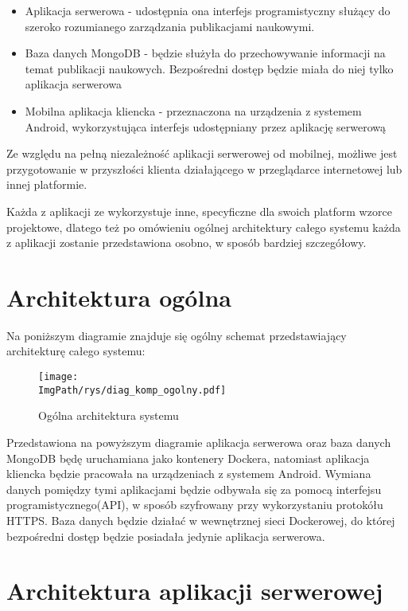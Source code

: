 \documentclass[a4paper,12pt,twoside,openany]{report}
\newcommand{\ImgPath}{.}
\begin{document}
\begin{itemize}
	\item Aplikacja serwerowa - udostępnia ona interfejs programistyczny służący do szeroko rozumianego zarządzania publikacjami naukowymi. 
	\item Baza danych MongoDB - będzie służyła do przechowywanie informacji na temat publikacji naukowych. Bezpośredni dostęp będzie miała do niej tylko aplikacja serwerowa
	\item Mobilna aplikacja kliencka - przeznaczona na urządzenia z systemem Android, wykorzystująca interfejs udostępniany przez aplikację serwerową
\end{itemize}

Ze względu na pełną niezależność aplikacji serwerowej od mobilnej, możliwe jest przygotowanie w przyszłości klienta działającego w przeglądarce internetowej lub innej platformie. 

Każda z aplikacji ze wykorzystuje inne, specyficzne dla swoich platform wzorce projektowe, dlatego też po omówieniu ogólnej architektury całego systemu  każda z aplikacji zostanie przedstawiona osobno, w sposób bardziej szczegółowy. 

\newpage
\section{Architektura ogólna}
Na poniższym diagramie znajduje się ogólny schemat przedstawiający architekturę całego systemu: 

 \begin{figure}[!htbp]
 	\begin{center}
 		\centering
 		\texttt{[image: \\ImgPath/rys/diag\_komp\_ogolny.pdf]}
 	\end{center}
 	\caption{Ogólna architektura systemu}
 	\label{ogolnaArchitektura}
 \end{figure}
 Przedstawiona na powyższym diagramie aplikacja serwerowa oraz baza danych MongoDB będę uruchamiana jako kontenery Dockera, natomiast aplikacja kliencka będzie pracowała na urządzeniach z systemem Android. Wymiana danych pomiędzy tymi aplikacjami będzie odbywała się za pomocą interfejsu programistycznego(API), w sposób szyfrowany przy wykorzystaniu protokółu HTTPS.
 Baza danych będzie działać w wewnętrznej sieci Dockerowej, do której bezpośredni dostęp będzie posiadała jedynie aplikacja serwerowa. 

\section{Architektura aplikacji serwerowej}
\end{document}
